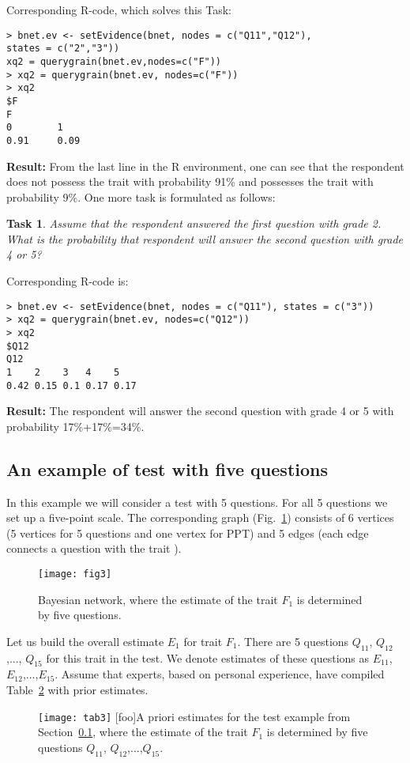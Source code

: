 \documentclass[12pt]{article}
\newtheorem{task}{Task}[section]
\begin{document}
%
Corresponding R-code, which solves this Task:
\begin{verbatim}
> bnet.ev <- setEvidence(bnet, nodes = c("Q11","Q12"), 
states = c("2","3"))
xq2 = querygrain(bnet.ev,nodes=c("F"))
> xq2 = querygrain(bnet.ev, nodes=c("F"))
> xq2
$F
F
0        1 
0.91     0.09 
\end{verbatim}
%
\textbf{Result:} From the last line in the R environment, one can see that the respondent does not possess the trait with probability 91\% and possesses the trait with probability 9\%.
%
%
One more task is formulated as follows:
\begin{task}
\label{a:alg5}
Assume that the respondent answered the first question with grade 2. What is the probability that respondent will answer the second question with grade 4 or 5? 
\end{task}
%
Corresponding R-code is:
\begin{verbatim}
> bnet.ev <- setEvidence(bnet, nodes = c("Q11"), states = c("3"))
> xq2 = querygrain(bnet.ev, nodes=c("Q12"))
> xq2
$Q12
Q12
1    2    3   4    5 
0.42 0.15 0.1 0.17 0.17 
\end{verbatim}
%
\textbf{Result:} The respondent will answer the second question with grade 4 or 5 with probability 17\%+17\%=34\%.

%
\subsection{An example of test with five questions}
\label{sec:Ex3}
In this example we will consider a test with 5 questions. For all 5 questions we set up a five-point scale. The corresponding graph (Fig.~\ref{fig3}) consists of 6 vertices (5 vertices for 5 questions and one vertex for PPT) and 5 edges (each edge connects a question with the trait ). 
%
%
\begin{figure}[!ht]
 \centering
  \texttt{[image: fig3]}
 \caption{Bayesian network, where the estimate of the trait $F_1$ is determined by five questions.}
  \label{fig3}
\end{figure}
%
%
%
%
Let us build the overall estimate $E_1$ for trait $F_1$. There are 5 questions $Q_{11}$, $Q_{12}$,..., $Q_{15}$ for this trait in the test. We denote estimates of these questions as $E_{11}$, $E_{12}$,...,$E_{15}$. 
Assume that experts, based on personal experience, have compiled Table~\ref{tab3} with prior estimates.

\begin{figure}[!ht]
\centering
\texttt{[image: tab3]}
[foo]{A priori estimates for the test example from Section~\ref {sec:Ex3}, where the estimate of the trait $F_1$ is determined by five questions $Q_{11}$, $Q_{12}$,...,$Q_{15}$.
}
\label{tab3}
\end{figure}
\end{document}
